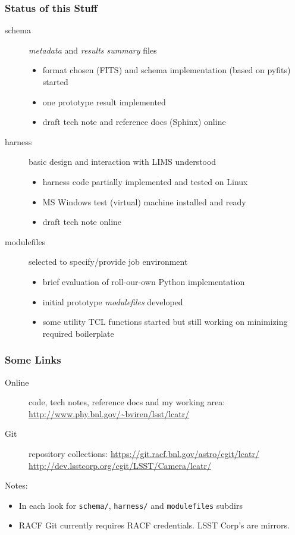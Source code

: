 \documentclass[xcolor=dvipsnames]{beamer}
\newcommand{\code}[1]{\texttt{#1}}
\begin{document}
\begin{frame}
  \frametitle{Status of this Stuff}
  \begin{description}
  \item[schema] \textit{metadata} and \textit{results summary} files
    \begin{itemize}
    \item format chosen (FITS) and schema implementation (based on
      pyfits) started
    \item one prototype result implemented
    \item draft tech note and reference docs (Sphinx) online
    \end{itemize}
  \item[harness] basic design and interaction with LIMS understood
    \begin{itemize}
    \item harness code partially implemented and tested on Linux
    \item MS Windows test (virtual) machine installed and ready
    \item draft tech note online
    \end{itemize}
  \item[modulefiles] selected to specify/provide job environment
    \begin{itemize}
    \item brief evaluation of roll-our-own Python implementation
    \item initial prototype \textit{modulefiles} developed
    \item some utility TCL functions started but still working on
      minimizing required boilerplate
    \end{itemize}
  \end{description}
\end{frame}

\begin{frame}
  \frametitle{Some Links}

  \begin{description}
  \item[Online] code, tech notes, reference docs and my working area:\\
    \url{http://www.phy.bnl.gov/~bviren/lsst/lcatr/}
  \item[Git] repository collections:
    \url{https://git.racf.bnl.gov/astro/cgit/lcatr/}
    \url{http://dev.lsstcorp.org/cgit/LSST/Camera/lcatr/}
  \end{description}

  \vspace{1cm}
  \footnotesize
  Notes:
  \begin{itemize}
  \item In each look for \code{schema/}, \code{harness/} and
    \code{modulefiles} subdirs
  \item RACF Git currently requires RACF credentials.  LSST Corp's are
    mirrors.
  \end{itemize}
\end{frame}
\end{document}
